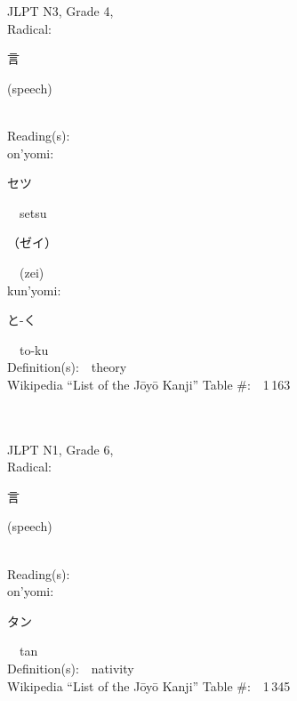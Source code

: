 \begin{multicols}{2}
{JLPT N3, Grade 4, \\Radical:\ \ {\begin{CJK}{UTF8}{min} 言 \end{CJK}} (speech) } \\
Reading(s):\ \ \\
{\hspace*{1em}}on'yomi:\ \ \\
{\hspace*{2em}}{\begin{CJK}{UTF8}{min} セツ \end{CJK}}\ \ setsu\ \ \\
{\hspace*{2em}}{\begin{CJK}{UTF8}{min} （ゼイ） \end{CJK}}\ \ (zei)\ \ \\
{\hspace*{1em}}kun'yomi:\ \ \\
{\hspace*{2em}}{\begin{CJK}{UTF8}{min} と-く \end{CJK}}\ \ to-ku\ \ \\
Definition(s):\ \ theory \\
Wikipedia ``List of the J\=oy\=o Kanji'' Table \#:\ \ 1\,163 \\
\ \ \\
{\fontsize{34pt}{40pt}  }\ \ \\  %
{JLPT N1, Grade 6, \\Radical:\ \ {\begin{CJK}{UTF8}{min} 言 \end{CJK}} (speech) } \\
Reading(s):\ \ \\
{\hspace*{1em}}on'yomi:\ \ \\
{\hspace*{2em}}{\begin{CJK}{UTF8}{min} タン \end{CJK}}\ \ tan\ \ \\
Definition(s):\ \ nativity \\
Wikipedia ``List of the J\=oy\=o Kanji'' Table \#:\ \ 1\,345 \\
\ \ \\
{\fontsize{34pt}{40pt}  }\ \ \\  %

\end{multicols}
